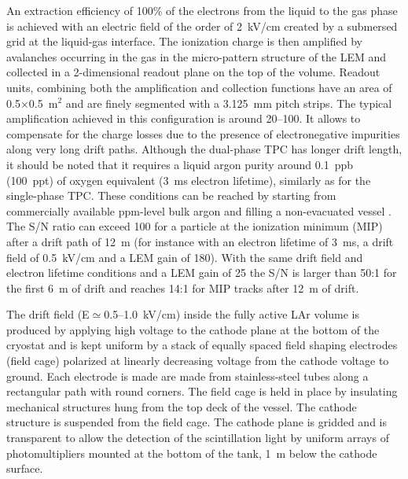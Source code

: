 An extraction efficiency of 100\% of the electrons from the liquid to
the gas phase is achieved with an electric field of the order of
2~kV/cm created by a submersed grid at the liquid-gas interface. The
ionization charge is then amplified by avalanches occurring in the gas
in the micro-pattern structure of the LEM and collected in a
2-dimensional readout plane on the top of the volume. Readout units,
combining both the amplification and collection functions have an area
of 0.5$\times$0.5~m$^2$ and are finely segmented with a 3.125~mm
pitch strips. The typical amplification achieved in this configuration
is around 20--100. It allows to compensate for the charge losses due to
the presence of electronegative impurities along very long drift
paths. Although the dual-phase TPC has longer drift length, it should
be noted that it requires a liquid argon purity around 0.1~ppb 
(100~ppt) of oxygen equivalent (3~ms electron lifetime), similarly as
for the single-phase TPC. These conditions can be reached by starting
from commercially available ppm-level bulk argon and filling a
non-evacuated vessel \cite{WA105_TDR}. The S/N ratio can exceed 100
for a particle at the ionization minimum (MIP) after a drift path of
12~m (for instance with an electron lifetime of 3~ms, a drift field of
0.5~kV/cm and a LEM gain of 180). With the same drift field and
electron lifetime conditions and a LEM gain of 25 the S/N is larger
than 50:1 for the first 6~m of drift and reaches 14:1 for MIP tracks
after 12~m of drift.

The drift field (E${\simeq}$0.5--1.0~kV/cm) inside the fully active
LAr volume is produced by applying high voltage to the cathode plane
at the bottom of the cryostat and is kept uniform by a stack of
equally spaced field shaping electrodes (field cage) polarized at
linearly decreasing voltage from the cathode voltage to ground. Each
electrode is made are made from stainless-steel tubes along a
rectangular path with round corners. The field cage is held in place
by insulating mechanical structures hung from the top deck of the
vessel.  The cathode structure is suspended from the field cage. The
cathode plane is gridded and is transparent to allow the detection of
the scintillation light by uniform arrays of photomultipliers mounted
at the bottom of the tank, 1~m below the cathode surface.

